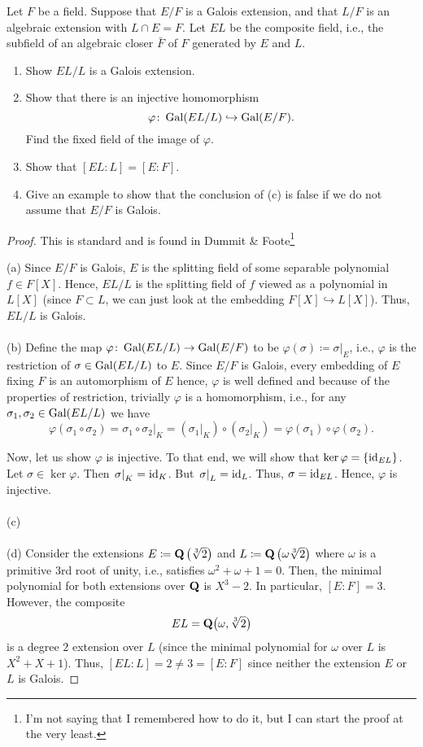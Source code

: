 \begin{problem}
Let $F$ be a field. Suppose that $E/F$ is a Galois extension, and that
$L/F$ is an algebraic extension with $L\cap E=F$. Let $EL$ be the composite
field, i.e., the subfield of an algebraic closer $\bar F$ of $F$ generated
by $E$ and $L$.
\begin{enumerate}[label=(\alph*)]
\item Show $EL/L$ is a Galois extension.
\item Show that there is an injective homomorphism
\[\varphi\colon\operatorname{Gal}(EL/L)\hookrightarrow\operatorname{Gal}(E/F).\]
Find the fixed field of the image of $\varphi$.
\item Show that $[EL:L]=[E:F]$.
\item Give an example to show that the conclusion of (c) is false if we do
  not assume that $E/F$ is Galois.
\end{enumerate}
\end{problem}
\begin{proof}
This is standard and is found in Dummit \& Foote\footnote{I'm not saying that I
remembered how to do it, but I can start the proof at the very least.}

(a) Since $E/F$ is Galois, $E$ is the splitting field of some separable
polynomial $f\in F[X]$. Hence, $EL/L$ is the splitting field of $f$ viewed
as a polynomial in $L[X]$ (since $F\subset L$, we can just look at the
embedding $F[X]\hookrightarrow L[X]$). Thus, $EL/L$ is Galois.
\\\\
(b) Define the map $\varphi\colon\operatorname{Gal}(EL/L)\to\operatorname{Gal}(E/F)$ to be
$\varphi(\sigma)\coloneqq\left.\sigma\right|_{E}$, i.e., $\varphi$ is the
restriction of $\sigma\in\operatorname{Gal}(EL/L)$ to $E$. Since $E/F$ is Galois, every
embedding of $E$ fixing $F$ is an automorphism of $E$ hence, $\varphi$ is
well defined and because of the properties of restriction, trivially
$\varphi$ is a homomorphism, i.e., for any $\sigma_1,\sigma_2\in\operatorname{Gal}(EL/L)$
we have
\[
\varphi(\sigma_1\circ\sigma_2)
=\left.\sigma_1\circ\sigma_2\right|_K
=\left(\left.\sigma_1\right|_K\right)\circ\left(\left.\sigma_2\right|_K\right)
=\varphi(\sigma_1)\circ\varphi(\sigma_2).
\]

Now, let us show $\varphi$ is injective. To that end, we will show that
$\ker\varphi=\{\operatorname{id}_{EL}\}$. Let $\sigma\in\ker\varphi$. Then
$\left.\sigma\right|_K=\operatorname{id}_K$. But $\left.\sigma\right|_L=\operatorname{id}_L$. Thus,
$\sigma=\operatorname{id}_{EL}$. Hence, $\varphi$ is injective.
\\\\
(c)
\\\\
(d) Consider the extensions $E\coloneqq\mathbf{Q}\left(\sqrt[3]{2}\right)$ and
$L\coloneqq\mathbf{Q}\left(\omega\sqrt[3]{2}\right)$ where $\omega$ is a primitive $3$rd
root of unity, i.e., satisfies $\omega^2+\omega+1=0$. Then, the minimal
polynomial for both extensions over $\mathbf{Q}$ is $X^3-2$. In particular,
$[E:F]=3$. However, the composite
\[
EL=\mathbf{Q}\bigl(\omega,\sqrt[3]{2}\bigr)
\]
is a degree $2$ extension over $L$ (since the minimal polynomial for
$\omega$ over $L$ is $X^2+X+1$). Thus, $[EL:L]=2\neq 3=[E:F]$ since neither
the extension $E$ or $L$ is Galois.
\end{proof}


